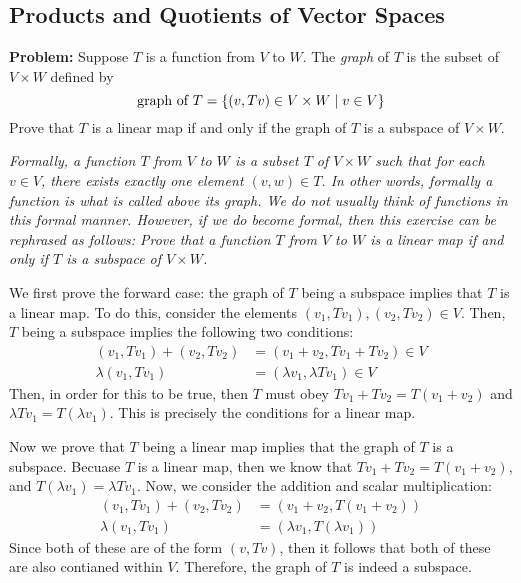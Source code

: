 \documentclass[10pt]{article}
\newenvironment{problem}{\textbf{Problem:}}{}
\begin{document}
	\subsection{Products and Quotients of Vector Spaces}
	\begin{problem}
		Suppose \( T \) is a function from \( V \) to \( W \). The \textit{graph} of \( T \) is the subset 
		of \( V \times W \) defined by \[
		\text{graph of \( T \)} = \{(v, Tv) \in V \times W \mid v \in V\} 
		\] 
		Prove that \( T \) is a linear map if and only if the graph of \( T \) is a subspace of \( V \times W \).

		\begin{center}
			\begin{minipage}{0.9\textwidth} 
				\textit{Formally, a function \( T \) from \( V \) to \( W \) is a subset \( T \) of 
					\( V \times  W \) such that for each \( v \in V \), there exists exactly one element 
					\( (v, w) \in T \). In other words, formally a function is what is called above its graph. 
					We do not usually think of functions in this formal manner. However, if we do 
					become formal, then this exercise can be rephrased as follows: Prove that a function 
					\( T \) from \( V \) to \( W \) is a linear map if and only if \( T \) is a subspace 
				of \( V\times  W \). }
			\end{minipage}
		\end{center}
	\end{problem}

	\begin{solution}
		We first prove the forward case: the graph of \( T \) being a subspace implies that \( T \) is a 
		linear map. To do this, consider the elements \( (v_1, Tv_1), (v_2, Tv_2) \in V\). Then, \( T \) being a 
		subspace implies the following two conditions:
		\begin{align*}
			(v_1, Tv_1) + (v_2, Tv_2) &= (v_1 + v_2, Tv_1 + Tv_2) \in V\\
			\lambda(v_1, Tv_1) &= (\lambda v_1, \lambda Tv_1) \in V
		\end{align*}
		Then, in order for this to be true, then \( T \) must obey \( Tv_1 + Tv_2 = T(v_1 + v_2) \) and 
		\( \lambda Tv_1 = T(\lambda v_1) \). This is precisely the conditions for a linear map. 

		Now we prove that \( T \) being a linear map implies that the graph of \( T \) is a subspace. Becuase 
		\( T \) is a linear map, then we know that \( Tv_1 + Tv_2 = T(v_1 + v_2) \), and \( T(\lambda v_1) = 
		\lambda Tv_1\). Now, we consider the addition and scalar multiplication:
		\begin{align*}
			(v_1, Tv_1) + (v_2, Tv_2) &= (v_1 + v_2, T(v_1 + v_2))\\
			\lambda(v_1, Tv_1) &= (\lambda v_1, T(\lambda v_1))
		\end{align*}
		Since both of these are of the form \( (v, Tv) \), then it follows that both of these are also contianed 
		within \( V \). Therefore, the graph of \( T \) is indeed a subspace. 
	\end{solution}
\end{document}
